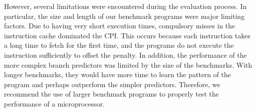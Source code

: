 \documentclass[conference, hidelinks]{IEEEtran}
\begin{document}
However, several limitations were encountered during the evaluation process. In particular, the size and length of our benchmark programs were major limiting factors. Due to having very short execution times, compulsory misses in the instruction cache dominated the CPI. This occurs because each instruction takes a long time to fetch for the first time, and the programs do not execute the instruction sufficiently to offset the penalty. In addition, the performance of the more complex branch predictors was limited by the size of the benchmarks. With longer benchmarks, they would have more time to learn the pattern of the program and perhaps outperform the simpler predictors. Therefore, we recommend the use of larger benchmark programs to properly test the performance of a microprocessor.

{}

\end{document}

